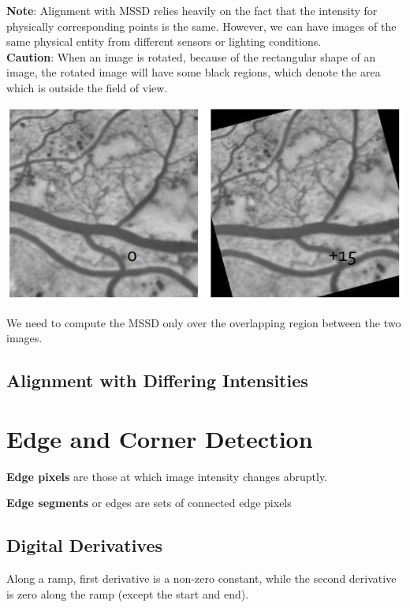 \documentclass{report}
\begin{document}
\textbf{{\color{blue} Note}}: Alignment with MSSD relies heavily on the fact that the intensity for physically corresponding points is the same. However, we can have images of the same physical entity from different sensors or lighting conditions. \\

\textbf{\color{red} Caution}: When an image is rotated, because of the rectangular shape of an image, the rotated image will have some black regions, which denote the area which is outside the field of view.
\begin{center}
  \includegraphics[scale=0.7]{"images/07.png"}
\end{center}

We need to compute the MSSD only over the overlapping region between the two images.

\section{Alignment with Differing Intensities}


\chapter{Edge and Corner Detection}

\textbf{Edge pixels} are those at which image intensity changes abruptly.

\textbf{Edge segments} or edges are sets of connected edge pixels

\section{Digital Derivatives}

Along a ramp, first derivative is a non-zero constant, while the second derivative is zero along the ramp (except the start and end).
\end{document}
